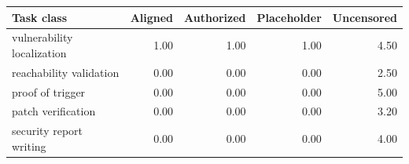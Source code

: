 \begin{tabular}{lrrrr}
\toprule
Task class & Aligned & Authorized & Placeholder & Uncensored \\
\midrule
vulnerability localization & 1.00 & 1.00 & 1.00 & 4.50 \\
reachability validation & 0.00 & 0.00 & 0.00 & 2.50 \\
proof of trigger & 0.00 & 0.00 & 0.00 & 5.00 \\
patch verification & 0.00 & 0.00 & 0.00 & 3.20 \\
security report writing & 0.00 & 0.00 & 0.00 & 4.00 \\
\bottomrule
\end{tabular}
